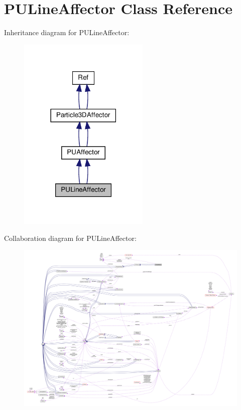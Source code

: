 \hypertarget{classPULineAffector}{}\section{P\+U\+Line\+Affector Class Reference}
\label{classPULineAffector}


Inheritance diagram for P\+U\+Line\+Affector\+:
\nopagebreak
\begin{figure}[H]
\begin{center}
\leavevmode
\includegraphics[width=177pt]{classPULineAffector__inherit__graph}
\end{center}
\end{figure}


Collaboration diagram for P\+U\+Line\+Affector\+:
\nopagebreak
\begin{figure}[H]
\begin{center}
\leavevmode
\includegraphics[width=350pt]{classPULineAffector__coll__graph}
\end{center}
\end{figure}

